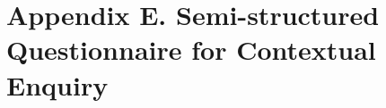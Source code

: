 
\chapter{Appendix E. Semi-structured Questionnaire for Contextual Enquiry} %
\clearpage
\label{AppendixE} %


\clearpage
%

%

% 
